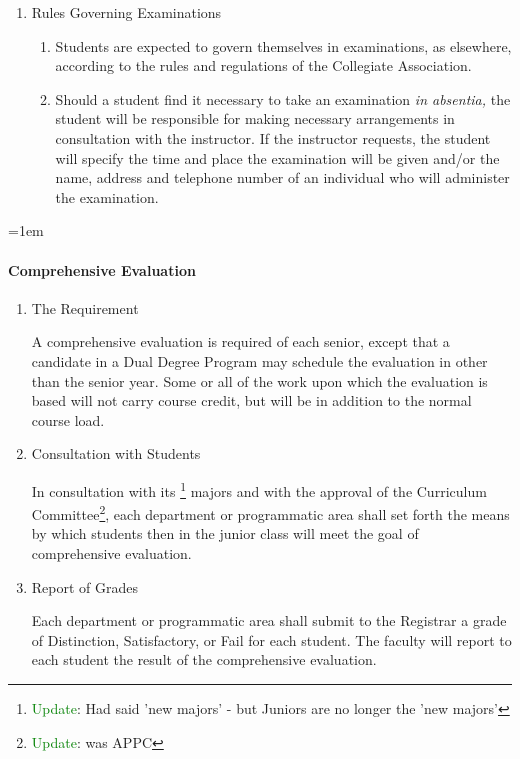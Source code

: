 \documentclass{manual}
\let\oldparagraph\paragraph
\renewcommand\paragraph{\leftskip=1em\oldparagraph}
\newcommand{\editRemark}[3]{\textcolor{green}{#2}\footnote{\textcolor{green}{#1}: #3}}
\newcommand{\editRemove}[1]{}
\newcommand{\itemLevelA}{\alph*.}
\newcommand{\itemLevelB}{\arabic*)}
\newcommand{\itemRefA}{\alph*}
\newcommand{\itemRefB}{\arabic*}
\begin{document}
\begin{enumerate}[label=\alph*]
\item Rules Governing Examinations

\begin{enumerate}[label=\itemLevelB,ref=\itemRefB]
\item Students are expected to govern themselves in examinations, as elsewhere, according to the rules and regulations of the Collegiate Association.
\item Should a student find it necessary to take an examination \textit{in absentia, }the student will be responsible for making necessary arrangements in consultation with the instructor. If the instructor requests, the student will specify the time and place the examination will be given and/or the name, address and telephone number of an individual who will administer the examination.
\end{enumerate}
\end{enumerate}

\paragraph{Comprehensive Evaluation}

\begin{enumerate}[label=\itemLevelA,ref=\itemRefA]
\item The Requirement

A comprehensive evaluation is required of each senior, except that a candidate in a Dual Degree Program may schedule the evaluation in other than the senior year. Some or all of the work upon which the evaluation is based will not carry course credit, but will be in addition to the normal course load.
\item Consultation with Students

In consultation with its \editRemove{new}\editRemark{Update}{}{Had said 'new majors' - but Juniors are no longer the 'new majors'} majors and with the approval of the Curriculum Committee\editRemark{Update}{}{was APPC}, each department or programmatic area shall  set forth the means by which students then in the junior class will meet the goal of comprehensive evaluation.

\item Report of Grades

Each department or programmatic area shall submit to the Registrar a grade of Distinction, Satisfactory, or Fail for each student. The faculty will report to each student the result of the comprehensive evaluation.

\end{enumerate}
\end{document}
